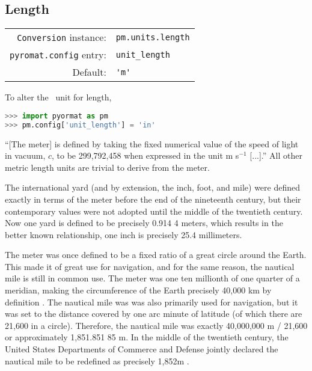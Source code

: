 %
%

\subsection{Length}\label{sec:units:length}

\begin{tabular}{rl}
\hline
\verb|Conversion| instance: & \verb|pm.units.length|\\
\verb|pyromat.config| entry: & \verb|unit_length|\\
Default: & \verb|'m'|\\
\hline
\end{tabular}
\vspace{1em}

To alter the \PM\ unit for length,
\begin{lstlisting}[language=Python]
>>> import pyormat as pm
>>> pm.config['unit_length'] = 'in'
\end{lstlisting}

``[The meter] is defined by taking the fixed numerical value of the speed of light in vacuum, $c$, to be 299,792,458 when expressed in the unit m s$^{-1}$ [...].''\cite{bipm} All other metric length units are trivial to derive from the meter.

The international yard (and by extension, the inch, foot, and mile) were defined exactly in terms of the meter before the end of the nineteenth century, but their contemporary values were not adopted until the middle of the twentieth century.\cite{nbs:sp477}  Now one yard is defined to be precisely 0.914 4 meters, which results in the better known relationship, one inch is precisely 25.4 millimeters.

The meter was once defined to be a fixed ratio of a great circle around the Earth.  This made it of great use for navigation, and for the same reason, the nautical mile is still in common use.  The meter was one ten millionth of one quarter of a meridian, making the circumference of the Earth precisely 40,000 km by definition \cite{nbs:sp447}.  The nautical mile was was also primarily used for navigation, but it was set to the distance covered by one arc minute of latitude (of which there are 21,600 in a circle).  Therefore, the nautical mile was exactly 40,000,000 m / 21,600 or approximately 1,851.851 85 m.  In the middle of the twentieth century, the United States Departments of Commerce and Defense jointly declared the nautical mile to be redefined as precisely 1,852m \cite{nbs:59:1959}.

